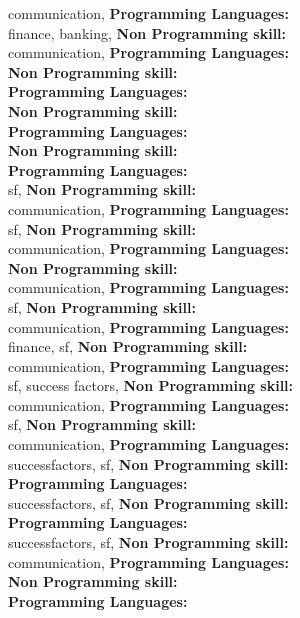 communication, \textbf{Programming Languages:} \\
finance, banking, \textbf{Non Programming skill:} \\
communication, \textbf{Programming Languages:} \\
\textbf{Non Programming skill:} \\
\textbf{Programming Languages:} \\
\textbf{Non Programming skill:} \\
\textbf{Programming Languages:} \\
\textbf{Non Programming skill:} \\
\textbf{Programming Languages:} \\
sf, \textbf{Non Programming skill:} \\
communication, \textbf{Programming Languages:} \\
sf, \textbf{Non Programming skill:} \\
communication, \textbf{Programming Languages:} \\
\textbf{Non Programming skill:} \\
communication, \textbf{Programming Languages:} \\
sf, \textbf{Non Programming skill:} \\
communication, \textbf{Programming Languages:} \\
finance, sf, \textbf{Non Programming skill:} \\
communication, \textbf{Programming Languages:} \\
sf, success factors, \textbf{Non Programming skill:} \\
communication, \textbf{Programming Languages:} \\
sf, \textbf{Non Programming skill:} \\
communication, \textbf{Programming Languages:} \\
successfactors, sf, \textbf{Non Programming skill:} \\
\textbf{Programming Languages:} \\
successfactors, sf, \textbf{Non Programming skill:} \\
\textbf{Programming Languages:} \\
successfactors, sf, \textbf{Non Programming skill:} \\
communication, \textbf{Programming Languages:} \\
\textbf{Non Programming skill:} \\
\textbf{Programming Languages:} \\

